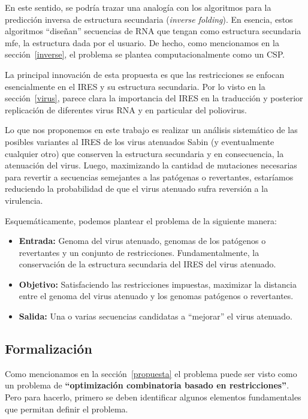 En este sentido, se podr\'ia trazar una analog\'ia con los algoritmos para la
predicci\'on inversa de estructura secundaria (\textit{inverse folding}). En
esencia, estos algoritmos ``dise\~nan'' secuencias de \ac{RNA} que tengan como
estructura secundaria \ac{mfe}, la estructura dada por el usuario. De hecho,
como mencionamos en la secci\'on~\ref{inverse}, el problema se plantea
computacionalmente como un \ac{CSP}.

La principal innovaci\'on de esta propuesta es que las restricciones se enfocan
esencialmente en el \ac{IRES} y su estructura secundaria. Por lo visto en la
secci\'on~\ref{virus}, parece clara la importancia del \ac{IRES} en la
traducci\'on y posterior replicaci\'on de diferentes virus \ac{RNA} y en
particular del poliovirus.

Lo que nos proponemos en este trabajo es realizar un an\'alisis sistem\'atico
de las posibles variantes al \ac{IRES} de los virus atenuados  Sabin (y
eventualmente cualquier otro) que conserven la estructura secundaria y
en consecuencia, la atenuaci\'on del virus. Luego, maximizando la cantidad de
mutaciones necesarias para revertir a secuencias semejantes a las pat\'ogenas o
revertantes, estar\'iamos reduciendo la probabilidad de que el virus atenuado
sufra reversi\'on a la virulencia.

Esquem\'aticamente, podemos plantear el problema de la siguiente manera:
\begin{itemize}
 \item \textbf{Entrada:} Genoma del virus atenuado, genomas de los pat\'ogenos
o revertantes y un conjunto de restricciones. Fundamentalmente, la
conservaci\'on de la estructura secundaria del \ac{IRES} del virus atenuado.
 \item \textbf{Objetivo:} Satisfaciendo las restricciones impuestas, maximizar
la distancia entre el genoma del virus atenuado y los genomas pat\'ogenos o
revertantes.
 \item \textbf{Salida:} Una o varias secuencias candidatas a ``mejorar'' el
virus atenuado.
\end{itemize}

\subsection{Formalizaci\'on}
\label{formalizacion-prop}
Como mencionamos en la secci\'on~\ref{propuesta} el problema puede ser visto
como un problema de \textbf{``optimizaci\'on combinatoria basado en
restricciones''}. Pero para hacerlo, primero se deben identificar algunos
elementos fundamentales que permitan definir el problema.

